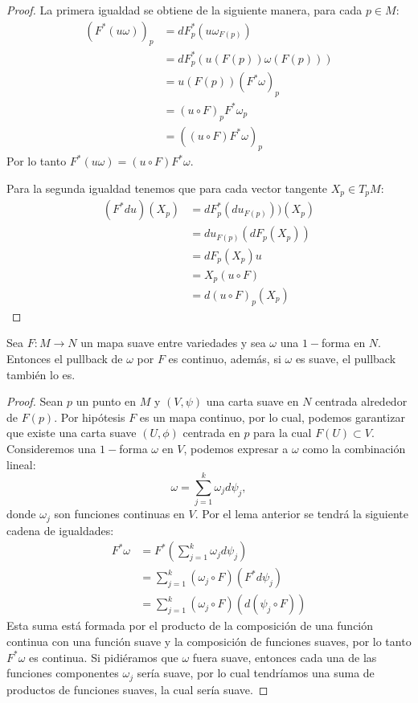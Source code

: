 \begin{proof}
	La primera igualdad se obtiene de la siguiente manera, para cada $p \in M$:
	\begin{align*}
		(F^{*}(u\omega))_p & = dF^{*}_{p} (u \omega_{F(p)})    \\
		                   & = dF^*_p ( u(F(p)) \omega(F(p)) ) \\
		                   & = u (F(p)) (F^{*}\omega)_p        \\
		                   & = (u \circ F)_{p} F^{*}\omega_p   \\
		                   & = ((u \circ F) F^*\omega)_p
	\end{align*}
	Por lo tanto $ F^{*}(u \omega) = (u \circ F) F^*\omega $.

	Para la segunda igualdad tenemos que para cada vector tangente $X_p \in T_{p}M$:
	\begin{align*}
		(F^{*}du)(X_p) & = dF_{p}^{*} (du_{F(p)}))(X_p) \\
		               & = du_{F(p)} (dF_{p}(X_p))      \\
		               & = dF_p (X_p)u                  \\
		               & = X_p (u \circ F)              \\
		               & = d(u \circ F)_p (X_p)
	\end{align*}
\end{proof}

\begin{theorem}
	Sea $F: M \to N$ un mapa suave entre variedades y sea $\omega$ una $1-$forma en $N$. Entonces el pullback de $\omega$ por $F$ es continuo, además, si $\omega$ es suave, el pullback también lo es.
\end{theorem}

\begin{proof}
	Sean $p$ un punto en $M$ y $(V, \psi)$ una carta suave en $N$ centrada alrededor de $F(p)$. Por hipótesis $F$ es un mapa continuo, por lo cual, podemos garantizar que existe una carta suave $(U,\phi)$ centrada en $p$ para la cual $F(U) \subset V$. Consideremos una $1-$forma $\omega$ en $V$, podemos expresar a $\omega$ como la combinación lineal:
	\[
		\omega = \sum_{j=1}^{k} \omega_j d\psi_j,
	\]
	donde $\omega_j$ son funciones continuas en $V$. Por el lema anterior se tendrá la siguiente cadena de igualdades:
	\begin{align*}
		F^{*}\omega & = F^{*}
		\left(\sum_{j=1}^{k} \omega_j d\psi_j\right)   \\
		            & =
		\sum_{j=1}^{k} (\omega_j\circ F)(F^{*}d\psi_j) \\
		            & =
    \sum_{j=1}^{k} (\omega_j \circ F) (d(\psi_j \circ F))
	\end{align*}
  Esta suma está formada por el producto de la composición de una función continua con una función suave y la composición de funciones suaves, por lo tanto $F^{*}\omega$ es continua. Si pidiéramos que $\omega$ fuera suave, entonces cada una de las funciones componentes $\omega_j$ sería suave, por lo cual tendríamos una suma de productos de funciones suaves, la cual sería suave.
\end{proof}
